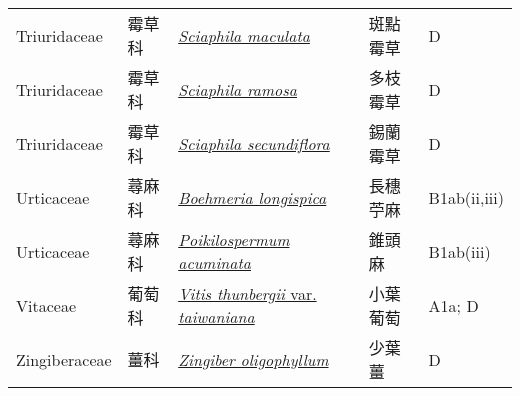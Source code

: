{\begin{longtable}{L{2.5cm}L{2cm}L{5cm}L{2.5cm}L{3cm}}
    Triuridaceae & 霉草科 & \href{http://www.theplantlist.org/tpl1.1/search?q=Sciaphila+maculata}{\textit{Sciaphila maculata} } & 斑點霉草 & D    \\
    Triuridaceae & 霉草科 & \href{http://www.theplantlist.org/tpl1.1/search?q=Sciaphila+ramosa}{\textit{Sciaphila ramosa} } & 多枝霉草 & D    \\
    Triuridaceae & 霉草科 & \href{http://www.theplantlist.org/tpl1.1/search?q=Sciaphila+secundiflora}{\textit{Sciaphila secundiflora} } & 錫蘭霉草 & D    \\
    Urticaceae & 蕁麻科 & \href{http://www.theplantlist.org/tpl1.1/search?q=Boehmeria+longispica}{\textit{Boehmeria longispica} } & 長穗苧麻 & B1ab(ii,iii)    \\
    Urticaceae & 蕁麻科 & \href{http://www.theplantlist.org/tpl1.1/search?q=Poikilospermum+acuminata}{\textit{Poikilospermum acuminata} } & 錐頭麻 & B1ab(iii)    \\
    Vitaceae & 葡萄科 & \href{http://www.theplantlist.org/tpl1.1/search?q=Vitis+thunbergii+var.+taiwaniana}{\textit{Vitis thunbergii} var. \textit{taiwaniana} } & 小葉葡萄 & A1a; D    \\
    Zingiberaceae & 薑科 & \href{http://www.theplantlist.org/tpl1.1/search?q=Zingiber+oligophyllum}{\textit{Zingiber oligophyllum} } & 少葉薑 & D    \\
    \bottomrule
        \end{longtable}
        }
    